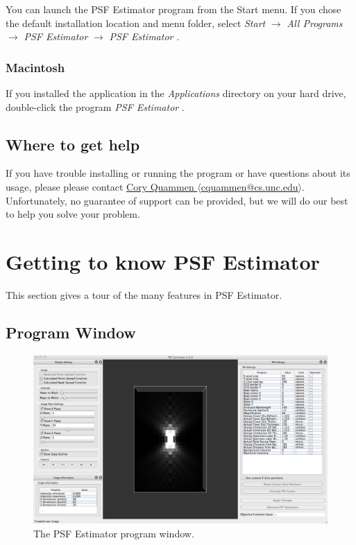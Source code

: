 \documentclass[11pt,titlepage,twoside]{article}
\begin{document}
You can launch the PSF Estimator program from the Start menu. If you chose the default installation location and menu folder, select \emph{Start} $\rightarrow$ \emph{All Programs} $\rightarrow$ \emph{PSF Estimator \ProgramVersionNoSpace} $\rightarrow$ \emph{PSF Estimator \ProgramVersionNoSpace}.

\subsubsection{Macintosh}

If you installed the application in the \emph{Applications} directory on your hard drive, double-click the program \emph{PSF Estimator \ProgramVersionNoSpace}.

\subsection{Where to get help}

If you have trouble installing or running the program or have questions about its usage, please please contact  \href{mailto:cquammen@cs.unc.edu}{Cory Quammen $\langle$cquammen@cs.unc.edu$\rangle$}. Unfortunately, no guarantee of support can be provided, but we will do our best to help you solve your problem.

\section{Getting to know PSF Estimator}

This section gives a tour of the many features in PSF Estimator.

\subsection{Program Window}

\begin{figure}[h]
  \centering
  \includegraphics[scale=0.3]{images/ProgramWindow}
  \caption{The PSF Estimator program window.}
  \label{fig:ProgramWindow}
\end{figure}
\end{document}
